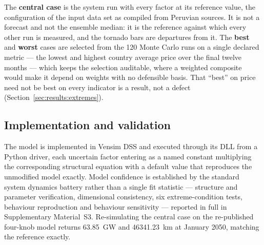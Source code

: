 The \textbf{central case} is the system run with every factor at its reference value,
the configuration of the input data set as compiled from Peruvian sources. It is not a
forecast and not the ensemble median: it is the reference against which every other run
is measured, and the tornado bars are departures from it. The \textbf{best} and
\textbf{worst} cases are selected from the 120 Monte Carlo runs on a single declared
metric --- the lowest and highest country average price over the final twelve months
--- which keeps the selection auditable, where a weighted composite would make it
depend on weights with no defensible basis. That ``best'' on price need not be best on
every indicator is a result, not a defect
(Section~\ref{sec:results:extremes}).

\subsection{Implementation and validation}
\label{sec:method:validation}

The model is implemented in Vensim DSS \citep{ventana2024} and executed through its DLL
from a Python driver, each uncertain factor entering as a named constant multiplying
the corresponding structural equation with a default value that reproduces the
unmodified model exactly. Model confidence is established by the standard system
dynamics battery \citep{barlas1996,oliva2004,richardson2024} rather than a single fit
statistic --- structure and parameter verification, dimensional consistency, six
extreme-condition tests, behaviour reproduction and behaviour sensitivity --- reported
in full in Supplementary Material~S3. Re-simulating the central case on the
re-published four-knob model returns \SI{63.85}{\giga\watt} and
\SI{46341.23}{\kilo\meter} at January 2050, matching the reference exactly.
